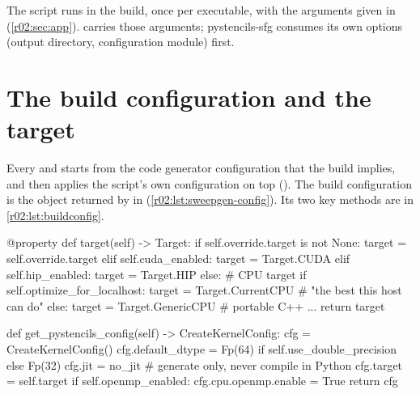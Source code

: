 The script runs in the build, once per executable, with the arguments given in
 (\cref{r02:sec:app}).  carries those
arguments; pystencils-sfg consumes its own options (output directory, configuration
module) first.

\section{The build configuration and the target}\label{r02:sec:buildconfig}

Every  and  starts from the code generator configuration that
the build implies, and then applies the script's own configuration on top
(). The build configuration is the
 object returned by  in
 (\cref{r02:lst:sweepgen-config}). Its two key methods are in
\cref{r02:lst:buildconfig}.

\begin{pycode}[nolol=false,caption={[Target selection in sweepgen's build configuration]Target selection in \texttt{sweepgen/src/sweepgen/build\_config.py} (unchanged upstream code, abridged).},label=r02:lst:buildconfig]
@property
def target(self) -> Target:
    if self.override.target is not None:
        target = self.override.target
    elif self.cuda_enabled:
        target = Target.CUDA
    elif self.hip_enabled:
        target = Target.HIP
    else:
        #  CPU target
        if self.optimize_for_localhost:
            target = Target.CurrentCPU      # "the best this host can do"
        else:
            target = Target.GenericCPU      # portable C++
    ...
    return target

def get_pystencils_config(self) -> CreateKernelConfig:
    cfg = CreateKernelConfig()
    cfg.default_dtype = Fp(64) if self.use_double_precision else Fp(32)
    cfg.jit = no_jit                        # generate only, never compile in Python
    cfg.target = self.target
    if self.openmp_enabled:
        cfg.cpu.openmp.enable = True
    return cfg
\end{pycode}

